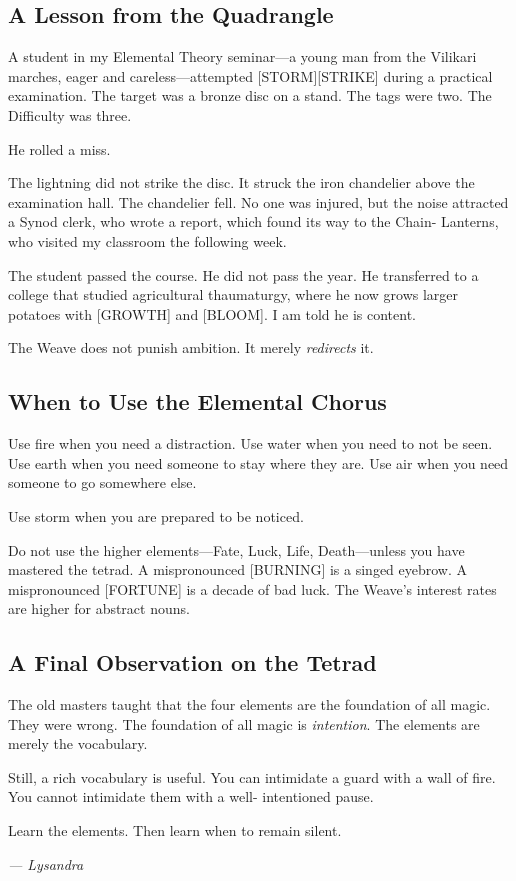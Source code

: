 \subsection{A Lesson from the Quadrangle}

A student in my Elemental Theory seminar---a young man from the Vilikari marches, eager and careless---attempted [STORM][STRIKE] during a practical examination. The target was a bronze disc on a stand. The tags were two. The Difficulty was three.

He rolled a miss.

The lightning did not strike the disc. It struck the iron chandelier above the examination hall. The chandelier fell. No one was injured, but the noise attracted a Synod clerk, who wrote a report, which found its way to the Chain- Lanterns, who visited my classroom the following week.

The student passed the course. He did not pass the year. He transferred to a college that studied agricultural thaumaturgy, where he now grows larger potatoes with [GROWTH] and [BLOOM]. I am told he is content.

The Weave does not punish ambition. It merely \emph{redirects} it.

\subsection{When to Use the Elemental Chorus}

Use fire when you need a distraction. Use water when you need to not be seen. Use earth when you need someone to stay where they are. Use air when you need someone to go somewhere else.

Use storm when you are prepared to be noticed.

Do not use the higher elements---Fate, Luck, Life, Death---unless you have mastered the tetrad. A mispronounced [BURNING] is a singed eyebrow. A mispronounced [FORTUNE] is a decade of bad luck. The Weave's interest rates are higher for abstract nouns.

\subsection{A Final Observation on the Tetrad}

The old masters taught that the four elements are the foundation of all magic. They were wrong. The foundation of all magic is \emph{intention}. The elements are merely the vocabulary.

Still, a rich vocabulary is useful. You can intimidate a guard with a wall of fire. You cannot intimidate them with a well- intentioned pause.

Learn the elements. Then learn when to remain silent.

\textit{--- Lysandra}
